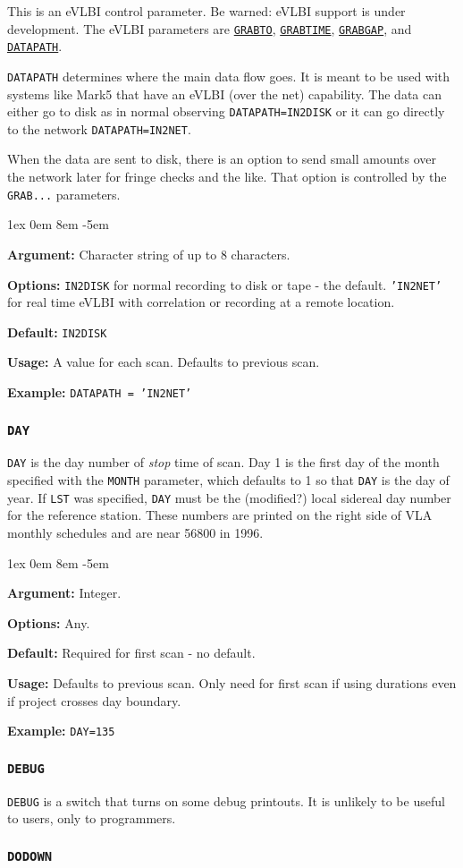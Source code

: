 \documentclass{report}
\newcommand{\rcwbox}[5]{
  \begin{list}{}{\parsep 1ex  \itemsep 0em
                 \leftmargin 8em  \itemindent -5em }
    \item {\bf Argument:} #1
    \item {\bf Options:}  #2
    \item {\bf Default:}  #3
    \item {\bf Usage:}    #4
    \item {\bf Example:}  #5
  \end{list}
}
\begin{document}
This is an eVLBI control parameter.  Be warned: eVLBI support is
under development.
The eVLBI parameters are 
{\hyperref[MP:GRABTO]{{\tt GRABTO}}},
{\hyperref[MP:GRABTIME]{{\tt GRABTIME}}}, 
{\hyperref[MP:GRABGAP]{{\tt GRABGAP}}},
and 
{\hyperref[MP:DATAPATH]{{\tt DATAPATH}}}.

{\tt DATAPATH} determines where the main data flow goes.  It is meant to
be used with systems like Mark5 that have an eVLBI (over the net)
capability.  The data can either go to disk as in normal observing
{\tt DATAPATH=IN2DISK} or it can go directly to the network
{\tt DATAPATH=IN2NET}.

When the data are sent to disk, there is an option to send small amounts
over the network later for fringe checks and the like.  That option is
controlled by the {\tt GRAB...} parameters.

\rcwbox
{ Character string of up to 8 characters.}
{  {\tt IN2DISK} for normal recording to disk or tape - the default.
{\tt 'IN2NET'} for real time eVLBI with correlation or recording
at a remote location.}
{{\tt IN2DISK}}
{A value for each scan.  Defaults to previous scan.}
{{\tt DATAPATH = 'IN2NET' }}


\subsubsection{\label{MP:DAY}{\tt DAY}}

{\tt DAY} is the day number of {\em stop} time of scan. Day 1
is the first day of the month specified with the {\tt MONTH}
parameter, which defaults to 1 so that {\tt DAY} is the day of
year. If {\tt LST} was specified, {\tt DAY} must be the (modified?)
local sidereal day number for the reference station. These numbers are
printed on the right side of VLA monthly schedules and are near 56800
in 1996.

\rcwbox
{Integer.}
{Any.}
{Required for first scan - no default.}
{Defaults to previous scan. Only need for first scan if using
durations even if project crosses day boundary.}
{{\tt DAY=135}}


\subsubsection{\label{MP:DEBUG}{\tt DEBUG}}

{\tt DEBUG} is a switch that turns on some debug printouts.  It is
unlikely to be useful to users, only to programmers.


\subsubsection{\label{MP:DODOWN}{\tt DODOWN}}
\end{document}
